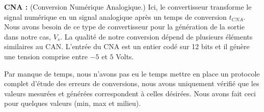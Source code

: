 \hspace{3mm} \textbf{CNA :} (Conversion Numérique Analogique.) Ici, le convertisseur transforme le signal numérique en un signal analogique après un temps de conversion $t_{CNA}$. Nous avons besoin de ce type de convertisseur pour la génération de la sortie dans notre cas, $V_{s}$. La qualité de notre conversion dépend de plusieurs éléments similaires au CAN. L'entrée du CNA est un entier codé sur 12 bits et il génère une tension comprise entre $-5$ et $5$ Volts. 


Par manque de temps, nous n'avons pas eu le temps mettre en place un protocole complet d'étude des erreurs de conversions, nous avons uniquement vérifié que les valeurs mesurées et générées correspondent à celles désirées. Nous avons fait ceci pour quelques valeurs (min, max et milieu).

